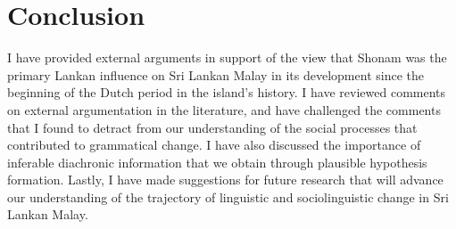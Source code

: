 \section{Conclusion}%

I have provided external arguments in support of the view that Shonam was the primary Lankan influence on Sri Lankan Malay in its development since the beginning of the Dutch period in the island's history. I have reviewed comments on external argumentation in the literature, and have challenged the comments that I found to detract from our understanding of the social processes that contributed to grammatical change. I have also discussed the importance of inferable diachronic information that we obtain through plausible hypothesis formation. Lastly, I have made suggestions for future research that will advance our understanding of the trajectory of linguistic and sociolinguistic change in Sri Lankan Malay.
